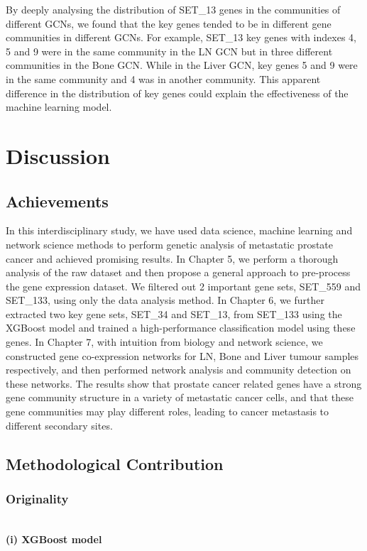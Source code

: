 \documentclass[12pt,a4paper]{report}
\begin{document}
By deeply analysing the distribution of SET\_13 genes in the communities of different GCNs, we found that the key genes tended to be in different gene communities in different GCNs. For example, SET\_13 key genes with indexes 4, 5 and 9 were in the same community in the LN GCN but in three different communities in the Bone GCN. While in the Liver GCN, key genes 5 and 9 were in the same community and 4 was in another community. This apparent difference in the distribution of key genes could explain the effectiveness of the machine learning model.\\

\chapter{Discussion}
\section{Achievements}
In this interdisciplinary study, we have used data science, machine learning and network science methods to perform genetic analysis of metastatic prostate cancer and achieved promising results. In Chapter 5, we perform a thorough analysis of the raw dataset and then propose a general approach to pre-process the gene expression dataset. We filtered out 2 important gene sets, SET\_559 and SET\_133, using only the data analysis method. In Chapter 6, we further extracted two key gene sets, SET\_34 and SET\_13, from SET\_133 using the XGBoost model and trained a high-performance classification model using these genes. In Chapter 7, with intuition from biology and network science, we constructed gene co-expression networks for LN, Bone and Liver tumour samples respectively, and then performed network analysis and community detection on these networks. The results show that prostate cancer related genes have a strong gene community structure in a variety of metastatic cancer cells, and that these gene communities may play different roles, leading to cancer metastasis to different secondary sites.\\

\section{Methodological Contribution }
\subsection{Originality}
\quad\\
\textbf{(i) XGBoost model} \\
\end{document}
